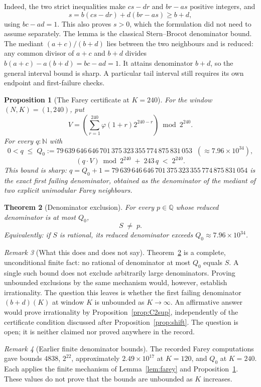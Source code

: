\documentclass[11pt]{article}
\theoremstyle{plain}
\newtheorem{thm}{Theorem}[section]
\newtheorem{prop}[thm]{Proposition}
\theoremstyle{definition}
\theoremstyle{remark}
\newtheorem{rem}[thm]{Remark}
\newcommand{\Q}{\mathbb{Q}}
\begin{document}
Indeed, the two strict inequalities make $cs-dr$ and $br-as$ positive
integers, and
\[
 s=b(cs-dr)+d(br-as)\ge b+d,
\]
using $bc-ad=1$. This also proves $s>0$, which the formulation did not
need to assume separately. The lemma is the classical Stern--Brocot
denominator bound. The mediant $(a+c)/(b+d)$ lies between the two
neighbours and is reduced: any common divisor of $a+c$ and $b+d$
divides $b(a+c)-a(b+d)=bc-ad=1$. It attains denominator $b+d$,
so the general interval bound is sharp. A particular tail interval
still requires its own endpoint and first-failure checks.

\begin{prop}[The Farey certificate at $K=240$]
\label{prop:gapwindow}
For the window $(N,K)=(1,240)$, put
\[
 V=\left(\sum_{r=1}^{240}\varphi(1+r)2^{240-r}\right)\bmod2^{240}.
\]
For every $q : \mathbb{N}$ with
\[
0 < q \;\le\; Q_0 := 79\,639\,646\,646\,701\,375\,323\,355\,774\,875\,831\,053 \;\;(\approx 7.96\times 10^{34}),
\]
\[
(q \cdot V) \bmod 2^{240} \;+\; 243\,q \;<\; 2^{240}.
\]
This bound is \emph{sharp}: $q = Q_0+1 = 79\,639\,646\,646\,701\,375\,323\,355\,774\,875\,831\,054$
is the exact first failing denominator, obtained as the denominator of
the mediant of two explicit unimodular Farey neighbours.
\end{prop}

\begin{thm}[Denominator exclusion]
\label{thm:denom-record}
For every $p\in\Q$ whose reduced denominator is at most $Q_0$,
\[
S \;\neq\; p.
\]
Equivalently: \emph{if $S$ is rational, its reduced denominator exceeds}
$Q_0 \approx 7.96 \times 10^{34}$.
\end{thm}

\begin{rem}[What this does and does not say]
Theorem~\ref{thm:denom-record} is a complete, unconditional finite fact: no rational
of denominator at most $Q_0$ equals $S$. A single such bound does not
exclude arbitrarily large denominators. Proving unbounded exclusions by
the same mechanism would, however, establish irrationality. The question
this leaves is whether the first failing denominator $(b+d)(K)$ at
window $K$ is unbounded as $K \to \infty$. An affirmative answer
would prove irrationality by Proposition~\ref{prop:C2sup}, independently of the
certificate condition discussed after Proposition~\ref{prop:shift}. The
question is open; it is neither claimed nor proved anywhere in the record.
\end{rem}

\begin{rem}[Earlier finite denominator bounds]
The recorded Farey computations gave bounds $4838$, $2^{22}$,
approximately $2.49\times10^{17}$ at $K=120$, and $Q_0$ at $K=240$.
Each applies the finite mechanism of Lemma~\ref{lem:farey} and
Proposition~\ref{prop:gapwindow}. These values do not prove that the
bounds are unbounded as $K$ increases.
\end{rem}
\end{document}
